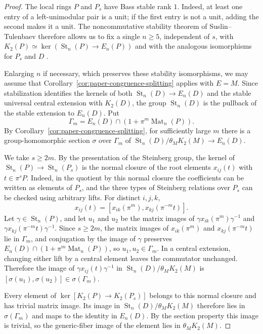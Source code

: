 \begin{proof}
The local rings $P$ and $P_s$ have Bass stable rank $1$.
Indeed, at least one entry of a left-unimodular pair is a unit; if the first entry is not a unit, adding the second makes it a unit.
The noncommutative stability theorem of Suslin--Tulenbaev therefore allows us to fix a single $n\ge5$, independent of $s$, with $K_2(P)\simeq\ker(\operatorname{St}_n(P)\to E_n(P))$ and with the analogous isomorphisms for $P_s$ and $D$ \cite{SuslinTulenbaev}.

Enlarging $n$ if necessary, which preserves these stability isomorphisms, we may assume that Corollary~\ref{cor:paper-congruence-splitting} applies with $E=M$.
Since stabilization identifies the kernels of both $\operatorname{St}_n(D)\to E_n(D)$ and the stable universal central extension with $K_2(D)$, the group $\operatorname{St}_n(D)$ is the pullback of the stable extension to $E_n(D)$.
Put
\[
 \Gamma_m=E_n(D)\cap(1+\pi^m\operatorname{Mat}_n(P)).
\]
By Corollary~\ref{cor:paper-congruence-splitting}, for sufficiently large $m$ there is a group-homomorphic section $\sigma$ over $\Gamma_m$ of $\operatorname{St}_n(D)/\theta_MK_2(M)\to E_n(D)$.

We take $s\ge 2m$.
By the presentation of the Steinberg group, the kernel of $\operatorname{St}_n(P)\to\operatorname{St}_n(P_s)$ is the normal closure of the root elements $x_{ij}(t)$ with $t\in\pi^sP$.
Indeed, in the quotient by this normal closure the coefficients can be written as elements of $P_s$, and the three types of Steinberg relations over $P_s$ can be checked using arbitrary lifts.
For distinct $i,j,k$,
\[
 x_{ij}(t)=[x_{ik}(\pi^m),x_{kj}(\pi^{-m}t)].
\]
Let $\gamma\in\operatorname{St}_n(P)$, and let $u_1$ and $u_2$ be the matrix images of $\gamma x_{ik}(\pi^m)\gamma^{-1}$ and $\gamma x_{kj}(\pi^{-m}t)\gamma^{-1}$.
Since $s\ge2m$, the matrix images of $x_{ik}(\pi^m)$ and $x_{kj}(\pi^{-m}t)$ lie in $\Gamma_m$, and conjugation by the image of $\gamma$ preserves $E_n(D)\cap(1+\pi^m\operatorname{Mat}_n(P))$, so $u_1,u_2\in\Gamma_m$.
In a central extension, changing either lift by a central element leaves the commutator unchanged.
Therefore the image of $\gamma x_{ij}(t)\gamma^{-1}$ in $\operatorname{St}_n(D)/\theta_MK_2(M)$ is $[\sigma(u_1),\sigma(u_2)]\in\sigma(\Gamma_m)$.

Every element of $\ker[K_2(P)\to K_2(P_s)]$ belongs to this normal closure and has trivial matrix image.
Its image in $\operatorname{St}_n(D)/\theta_MK_2(M)$ therefore lies in $\sigma(\Gamma_m)$ and maps to the identity in $E_n(D)$.
By the section property this image is trivial, so the generic-fiber image of the element lies in $\theta_MK_2(M)$.
\end{proof}

